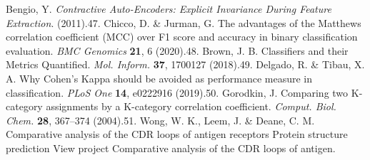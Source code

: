 \documentclass[
]{article}
\begin{document}
{{{Bengio, Y. \emph{Contractive Auto-Encoders: Explicit Invariance During
Feature Extraction}. (2011).47. Chicco, D. \& Jurman, G. The advantages
of the Matthews correlation coefficient (MCC) over F1 score and accuracy
in binary classification evaluation. \emph{BMC Genomics} \textbf{21}, 6
(2020).48. Brown, J. B. Classifiers and their Metrics Quantified.
\emph{Mol. Inform.} \textbf{37}, 1700127 (2018).49. Delgado, R. \&
Tibau, X. A. Why Cohen's Kappa should be avoided as performance measure
in classification. \emph{PLoS One} \textbf{14}, e0222916 (2019).50.
Gorodkin, J. Comparing two K-category assignments by a K-category
correlation coefficient. \emph{Comput. Biol. Chem.} \textbf{28},
367--374 (2004).51. Wong, W. K., Leem, J. \& Deane, C. M. Comparative
analysis of the CDR loops of antigen receptors Protein structure
prediction View project Comparative analysis of the CDR loops of
antigen.
}}}
\end{document}
